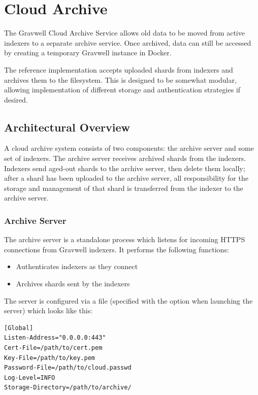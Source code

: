\chapter{Cloud Archive}

The Gravwell Cloud Archive Service allows old data to be moved from
active indexers to a separate archive service. Once archived, data can
still be accessed by creating a temporary Gravwell instance in Docker.

The reference implementation accepts uploaded shards from indexers and
archives them to the filesystem. This is designed to be somewhat
modular, allowing implementation of different storage and authentication
strategies if desired.

\section{Architectural Overview}

A cloud archive system consists of two components: the archive server
and some set of indexers. The archive server receives archived shards
from the indexers. Indexers send aged-out shards to the archive server,
then delete them locally; after a shard has been uploaded to the archive
server, all responsibility for the storage and management of that shard
is transferred from the indexer to the archive server.

\subsection{Archive Server}

The archive server is a standalone process which listens for incoming
HTTPS connections from Gravwell indexers. It performs the following
functions:

\begin{itemize}
\item
  Authenticates indexers as they connect
\item
  Archives shards sent by the indexers
\end{itemize}

The server is configured via a file (specified with the 
option when launching the server) which looks like this:

\begin{Verbatim}[breaklines=true]
[Global]
Listen-Address="0.0.0.0:443"
Cert-File=/path/to/cert.pem
Key-File=/path/to/key.pem
Password-File=/path/to/cloud.passwd
Log-Level=INFO
Storage-Directory=/path/to/archive/
\end{Verbatim}

